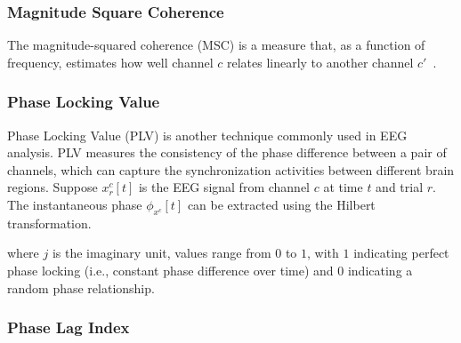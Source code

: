 \subsubsection{Magnitude Square Coherence}
The magnitude-squared coherence (MSC) is a measure that, as a function of frequency, estimates how well channel $c$ relates linearly to another channel $c'$~\cite{cattai2021phase}. 

\subsubsection{Phase Locking Value}

Phase Locking Value (PLV) is another technique commonly used in EEG analysis. PLV measures the consistency of the phase difference between a pair of channels, which can capture the synchronization activities between different brain regions. Suppose $x^{c}_{r}[t]$ is the EEG signal from channel $c$ at time $t$ and trial $r$. The instantaneous phase $\phi_{x^{c}}[t]$ can be extracted using the Hilbert transformation. 

where $j$ is the imaginary unit, values range from $0$ to $1$, with $1$ indicating perfect phase locking (i.e., constant phase difference over time) and $0$ indicating a random phase relationship.

\subsubsection{Phase Lag Index}

